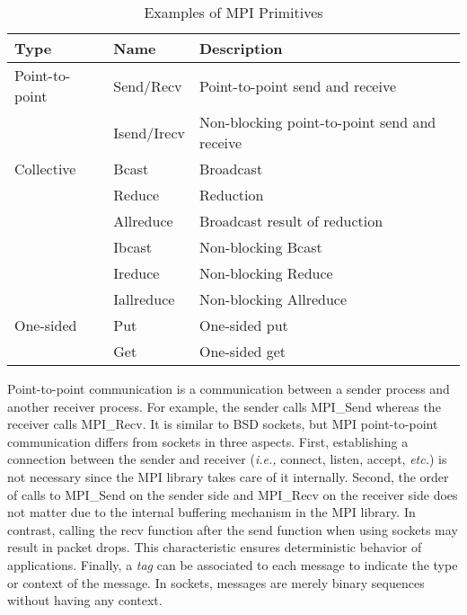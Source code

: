 \begin{table}
    \centering
    \caption{Examples of MPI Primitives}%
    \label{tbl:mpi-primitives}
\begin{tabular}{@{}lll@{}}
\toprule
Type           & Name        & Description \\ \midrule
Point-to-point & Send/Recv   & Point-to-point send and receive              \\
               & Isend/Irecv & Non-blocking point-to-point send and receive \\
\midrule
Collective     & Bcast       & Broadcast                                    \\
               & Reduce      & Reduction                                    \\
               & Allreduce   & Broadcast result of reduction                \\
               & Ibcast      & Non-blocking Bcast                           \\
               & Ireduce     & Non-blocking Reduce                          \\
               & Iallreduce  & Non-blocking Allreduce                       \\
\midrule
One-sided      & Put         & One-sided put                                \\
               & Get         & One-sided get                                \\
\bottomrule
\end{tabular}
\end{table}

Point-to-point communication is a communication between a sender process and
another receiver process. For example, the sender calls MPI\_Send whereas the
receiver calls MPI\_Recv. It is similar to BSD sockets, but MPI point-to-point
communication differs from sockets in three aspects. First, establishing a
connection between the sender and receiver (\emph{i.e.,} connect, listen,
accept, \emph{etc.}) is not necessary since the MPI library takes care of it
internally. Second, the order of calls to MPI\_Send on the sender side and
MPI\_Recv on the receiver side does not matter due to the internal
buffering mechanism in the MPI library. In contrast, calling the recv function
after the send function when using sockets may result in packet drops. This
characteristic ensures deterministic behavior of applications. Finally, a
\emph{tag} can be associated to each message to indicate the type or context
of the message. In sockets, messages are merely binary sequences without
having any context.

